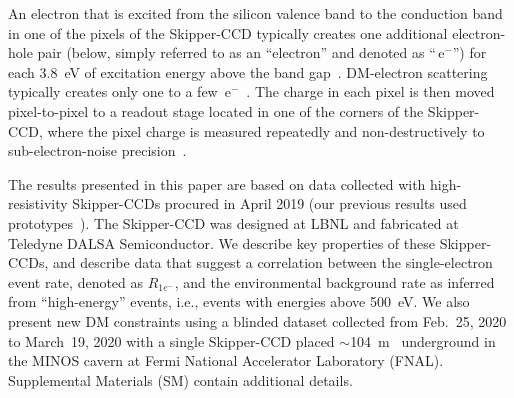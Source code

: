 \documentclass[aps,prl,twocolumn,showpacs,superscriptaddress,preprintnumbers]{revtex4-1}
\newcommand{\unit}[1]{\ensuremath{\mathrm{\,#1}}\xspace}
\newcommand{\e}{\unit{e^{-}}}
\newcommand{\Rs}{$R_{1e^-}$}
\begin{document}
An electron that is excited from the silicon valence band to the conduction band in one of the pixels of the Skipper-CCD 
typically creates one additional electron-hole pair (below, simply referred to as an ``electron'' and denoted as ``\e'') for each 3.8~eV of excitation energy above the band gap~\cite{Vavilov1962}.   DM-electron scattering typically creates only one to a few \e~\cite{Essig:2015cda}. The charge in each pixel is then moved pixel-to-pixel to a readout stage located in one of the corners of the Skipper-CCD, where the pixel charge is measured repeatedly and non-destructively to sub-electron-noise precision~\cite{Tiffenberg:2017aac}. 

The results presented in this paper are based on data collected with high-resistivity Skipper-CCDs procured in April 2019 
(our previous results used prototypes~\cite{Tiffenberg:2017aac,Crisler:2018gci,Abramoff:2019dfb}).  
The Skipper-CCD was designed at LBNL and fabricated at Teledyne DALSA Semiconductor.  
We describe key properties of these Skipper-CCDs, 
and describe data that suggest a correlation between the single-electron event rate, denoted as \Rs, and the environmental background rate as inferred from ``high-energy'' events, i.e., events with energies above 500~eV.  We also present new DM constraints using a blinded dataset collected from Feb.~25, 2020 to March~19, 2020 with a single Skipper-CCD placed $\sim$104~m~\cite{Adamson:2007gu} underground in the MINOS cavern at Fermi National Accelerator Laboratory (FNAL). Supplemental Materials (SM) contain additional details. 
\end{document}
